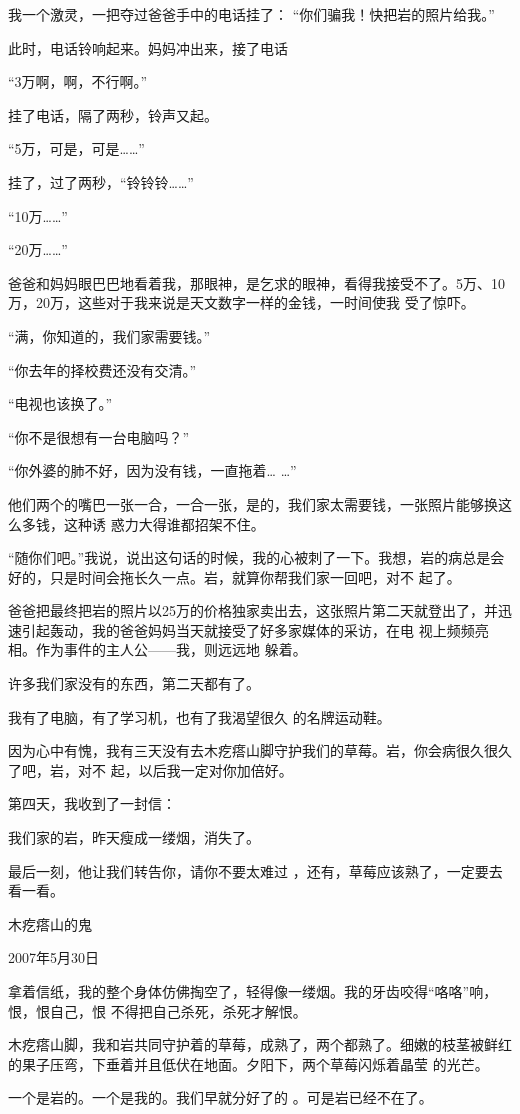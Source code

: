 \documentclass{article}
\begin{document}
我一个激灵，一把夺过爸爸手中的电话挂了：
“你们骗我！快把岩的照片给我。” 

\newpage

此时，电话铃响起来。妈妈冲出来，接了电话


“3万啊，啊，不行啊。” 


挂了电话，隔了两秒，铃声又起。 


“5万，可是，可是……” 


挂了，过了两秒，“铃铃铃……” 


“10万……” 


“20万……” 

爸爸和妈妈眼巴巴地看着我，那眼神，是乞求的眼神，看得我接受不了。5万、10万，20万，这些对于我来说是天文数字一样的金钱，一时间使我
受了惊吓。 


“满，你知道的，我们家需要钱。” 

\newpage


“你去年的择校费还没有交清。” 


“电视也该换了。” 


“你不是很想有一台电脑吗？” 

“你外婆的肺不好，因为没有钱，一直拖着…
…” 

他们两个的嘴巴一张一合，一合一张，是的，我们家太需要钱，一张照片能够换这么多钱，这种诱
惑力大得谁都招架不住。 

“随你们吧。”我说，说出这句话的时候，我的心被刺了一下。我想，岩的病总是会好的，只是时间会拖长久一点。岩，就算你帮我们家一回吧，对不
起了。 

爸爸把最终把岩的照片以25万的价格独家卖出去，这张照片第二天就登出了，并迅速引起轰动，我的爸爸妈妈当天就接受了好多家媒体的采访，在电
\newpage
视上频频亮相。作为事件的主人公——我，则远远地
躲着。 


许多我们家没有的东西，第二天都有了。 

我有了电脑，有了学习机，也有了我渴望很久
的名牌运动鞋。 

因为心中有愧，我有三天没有去木疙瘩山脚守护我们的草莓。岩，你会病很久很久了吧，岩，对不
起，以后我一定对你加倍好。 


第四天，我收到了一封信： 



我们家的岩，昨天瘦成一缕烟，消失了。 

最后一刻，他让我们转告你，请你不要太难过
，还有，草莓应该熟了，一定要去看一看。 


\newpage

木疙瘩山的鬼 


2007年5月30日 

拿着信纸，我的整个身体仿佛掏空了，轻得像一缕烟。我的牙齿咬得“咯咯”响，恨，恨自己，恨
不得把自己杀死，杀死才解恨。 

木疙瘩山脚，我和岩共同守护着的草莓，成熟了，两个都熟了。细嫩的枝茎被鲜红的果子压弯，下垂着并且低伏在地面。夕阳下，两个草莓闪烁着晶莹
的光芒。 

一个是岩的。一个是我的。我们早就分好了的
。可是岩已经不在了。 
\end{document}
